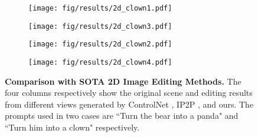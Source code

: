 \begin{figure}
    \begin{subfigure}{0.24\linewidth}
        \begin{minipage}[t]{1.0\linewidth}
            \centering
            \texttt{[image: fig/results/2d\_clown1.pdf]}
        \end{minipage}
    \end{subfigure}
    \hfill
    \begin{subfigure}{0.24\linewidth}
        \begin{minipage}[t]{1.0\linewidth}
            \centering
            \texttt{[image: fig/results/2d\_clown3.pdf]}
        \end{minipage}
    \end{subfigure}
    \hfill
    \begin{subfigure}{0.24\linewidth}
        \begin{minipage}[t]{1.0\linewidth}
            \centering
            \texttt{[image: fig/results/2d\_clown2.pdf]}
        \end{minipage}
    \end{subfigure}
    \begin{subfigure}{0.24\linewidth}
        \begin{minipage}[t]{1.0\linewidth}
            \centering
            \texttt{[image: fig/results/2d\_clown4.pdf]}
        \end{minipage}
    \end{subfigure}
  
    \caption{\textbf{Comparison with SOTA 2D Image Editing Methods.} The four columns respectively show the original scene and editing results from different views generated by ControlNet \cite{zhang2023adding}, IP2P \cite{brooks2023instructpix2pix}, and ours. The prompts used in two cases are ``Turn the bear into a panda" and ``Turn him into a clown" respectively.}
    \label{fig: 2D}
\end{figure}

